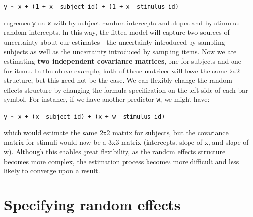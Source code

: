 \documentclass[]{book}
\begin{document}
\texttt{y\ \textasciitilde{}\ x\ +\ (1\ +\ x\ \textbar{}\ subject\_id)\ +\ (1\ +\ x\ \textbar{}\ stimulus\_id)}

regresses \texttt{y} on \texttt{x} with by-subject random intercepts and slopes and by-stimulus random intercepts. In this way, the fitted model will capture two sources of uncertainty about our estimates---the uncertainty introduced by sampling subjects as well as the uncertainty introduced by sampling items. Now we are estimating \textbf{two independent covariance matrices}, one for subjects and one for items. In the above example, both of these matrices will have the same 2x2 structure, but this need not be the case. We can flexibly change the random effects structure by changing the formula specification on the left side of each bar \texttt{\textbar{}} symbol. For instance, if we have another predictor \texttt{w}, we might have:

\texttt{y\ \textasciitilde{}\ x\ +\ (x\ \textbar{}\ subject\_id)\ +\ (x\ +\ w\ \textbar{}\ stimulus\_id)}

which would estimate the same 2x2 matrix for subjects, but the covariance matrix for stimuli would now be a 3x3 matrix (intercepts, slope of x, and slope of w). Although this enables great flexibility, as the random effects structure becomes more complex, the estimation process becomes more difficult and less likely to converge upon a result.

\hypertarget{specifying-random-effects}{%
\section{Specifying random effects}\label{specifying-random-effects}}
\end{document}
